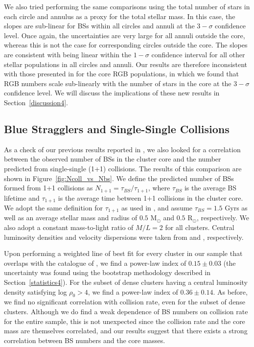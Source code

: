 We also tried 
performing the same comparisons using the total number of stars in each
circle and annulus as a proxy for the total stellar mass.  In this
case, the slopes are 
sub-linear for BSs within all circles and annuli at the
$3-\sigma$ confidence level.  Once again, the uncertainties are very
large for all annuli outside the core, whereas this is not the case
for corresponding circles outside the core.  The slopes are consistent
with being linear within the $1-\sigma$ confidence
interval for all other stellar populations in all circles and annuli.
Our results are therefore inconsistent with those presented in
\citet{leigh09} for the core RGB populations, in which we found that
RGB numbers scale sub-linearly with the number of stars in the core at
the $3-\sigma$ confidence level.  We will discuss the implications of
these new results in Section~\ref{discussion4}.

\subsection{Blue Stragglers and Single-Single Collisions} \label{collisions4}

As a check of our previous results reported in \citet{knigge09}, we
also looked for a correlation between the observed number of BSs in
the cluster core and the number predicted from single-single (1+1)
collisions.  The results of this comparison are shown in
Figure~\ref{fig:Ncoll_vs_Nbs}.  We define the predicted
number of BSs formed from 1+1 collisions as $N_{1+1} =
\tau_{BS}/\tau_{1+1}$, where $\tau_{BS}$ is the average BS lifetime
and $\tau_{1+1}$ is the average time between 1+1 collisions in the
cluster core.  We adopt the same
definition for $\tau_{1+1}$ as used in \citet{knigge09}, and assume
$\tau_{BS} = 1.5$ Gyrs as well as an average stellar mass and radius of
$0.5$ M$_{\odot}$ and $0.5$ R$_{\odot}$, respectively.  We also adopt
a constant mass-to-light ratio of $M/L = 2$ for all clusters.  Central
luminosity densities and velocity dispersions were taken from 
\citet{harris96} and \citet{webbink85}, respectively.

Upon performing a weighted line of best fit for every cluster in our
sample that overlaps with the catalogue of \citet{webbink85}, we find
a power-law index of $0.15 \pm 0.03$ (the uncertainty
was found using the bootstrap methodology described in
Section~\ref{statistics4}).  For the subset of dense 
clusters having a central luminosity density satisfying log
$\rho_0 > 4$, we find a power-law index of $0.36 \pm 0.14$.  As before,
we find no significant correlation with collision rate, even for the 
subset of dense clusters.  Although we do find a weak dependence of BS
numbers on collision rate for the entire sample, this is not
unexpected since the collision rate and the core mass are themselves
correlated, and our results suggest that there exists a strong
correlation between BS numbers and the core masses.


